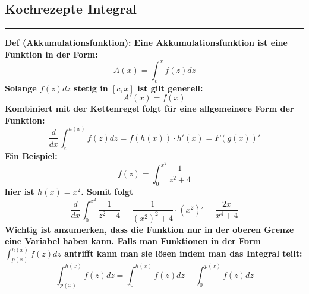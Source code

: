 \documentclass[7pt,landscape, margin = 0.1mm]{article}
\newcommand*{\mysubsection}[1]{\vspace{-2mm}\color{chaptercolor}\subsection{ #1 }
\vspace{-1mm}\hrule\vspace{1.5mm}\color{black}
\vspace{2mm}}
\newcommand{\COL}[1]{ \color{chaptercolor} \bf{#1}\color{black}     \\}
\newcommand{\DEF}[2]{\color{chaptercolor}\bf{Def #1}:\color{black}    \hspace{0.2cm} #2 \\}
\begin{document}
\begin{multicols}{4}


\mysubsection{Kochrezepte Integral}

\DEF{(Akkumulationsfunktion)}{
Eine Akkumulationsfunktion ist eine Funktion in der Form:
$$ A(x) = \int_{c}^{x} f(z)dz
$$
Solange $f(z)dz$ stetig in $[c,x]$ ist gilt generell: $$A'(x)=f(x) $$
Kombiniert mit der Kettenregel folgt für eine allgemeinere Form der Funktion:
$$\frac{d}{dx} \int_{c}^{h(x)} f(z)dz = f(h(x))\cdot h'(x) = F(g(x))' $$
Ein Beispiel:
$$f(z)=\int_{0}^{x^2} \frac{1}{z^2+4}$$
hier ist $h(x)=x^2$. Somit folgt
$$\frac{d}{dx}\int_{0}^{x^2} \frac{1}{z^2+4} = \frac{1}{(x^2)^2+4}\cdot (x^2)' = \frac{2x}{x^4+4}$$
Wichtig ist anzumerken, dass die Funktion nur in der oberen Grenze eine Variabel haben kann. Falls man Funktionen in der Form $
 \int_{p(x)}^{h(x)} f(z)dz$
 antrifft kann man sie lösen indem man das Integral teilt:
 $$ \int_{p(x)}^{h(x)} f(z)dz = \int_{0}^{h(x)} f(z)dz - \int_{0}^{p(x)} f(z)dz  $$}
 

\end{multicols}
\end{document}
